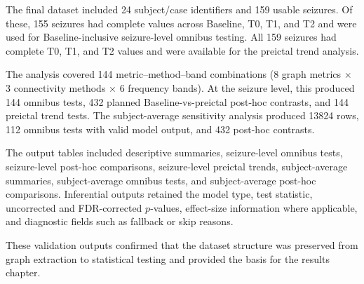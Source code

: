The final dataset included \num{24} subject/case identifiers and \num{159}
usable seizures. Of these, \num{155} seizures had complete values across
Baseline, T0, T1, and T2 and were used for Baseline-inclusive seizure-level
omnibus testing. All \num{159} seizures had complete T0, T1, and T2 values and
were available for the preictal trend analysis.

The analysis covered \num{144} metric--method--band combinations
(\num{8} graph metrics $\times$ \num{3} connectivity methods $\times$
\num{6} frequency bands). At the seizure level, this produced \num{144}
omnibus tests, \num{432} planned Baseline-vs-preictal post-hoc contrasts, and
\num{144} preictal trend tests. The subject-average sensitivity analysis
produced \num{13824} rows, \num{112} omnibus tests with valid model output, and
\num{432} post-hoc contrasts.

The output tables included descriptive summaries, seizure-level omnibus tests,
seizure-level post-hoc comparisons, seizure-level preictal trends,
subject-average summaries, subject-average omnibus tests, and subject-average
post-hoc comparisons. Inferential outputs retained the model type, test
statistic, uncorrected and FDR-corrected $p$-values, effect-size information
where applicable, and diagnostic fields such as fallback or skip reasons.

These validation outputs confirmed that the dataset structure was preserved
from graph extraction to statistical testing and provided the basis for the
results chapter.